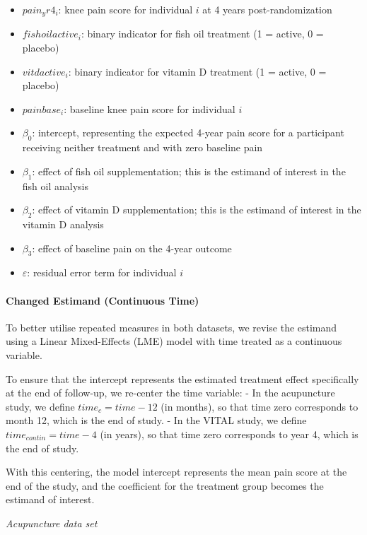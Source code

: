 \documentclass{article}
\providecommand{\tightlist}{%
  \setlength{\itemsep}{0pt}\setlength{\parskip}{0pt}}
\begin{document}
\begin{itemize}
\tightlist
\item
  \(pain_yr4_i\): knee pain score for individual \(i\) at 4 years
  post-randomization
\item
  \(fishoilactive_i\): binary indicator for fish oil treatment (1 =
  active, 0 = placebo)
\item
  \(vitdactive_i\): binary indicator for vitamin D treatment (1 =
  active, 0 = placebo)
\item
  \(painbase_i\): baseline knee pain score for individual \(i\)
\item
  \(\beta_0\): intercept, representing the expected 4-year pain score
  for a participant receiving neither treatment and with zero baseline
  pain
\item
  \(\beta_1\): effect of fish oil supplementation; this is the estimand
  of interest in the fish oil analysis
\item
  \(\beta_2\): effect of vitamin D supplementation; this is the estimand
  of interest in the vitamin D analysis
\item
  \(\beta_3\): effect of baseline pain on the 4-year outcome
\item
  \(\varepsilon\): residual error term for individual \(i\)
\end{itemize}

\paragraph{Changed Estimand (Continuous
Time)}\label{changed-estimand-continuous-time}

To better utilise repeated measures in both datasets, we revise the
estimand using a Linear Mixed-Effects (LME) model with time treated as a
continuous variable.

To ensure that the intercept represents the estimated treatment effect
specifically at the end of follow-up, we re-center the time variable: -
In the acupuncture study, we define \(time_c = time - 12\) (in months),
so that time zero corresponds to month 12, which is the end of study. -
In the VITAL study, we define \(time_{contin} = time - 4\) (in years),
so that time zero corresponds to year 4, which is the end of study.

With this centering, the model intercept represents the mean pain score
at the end of the study, and the coefficient for the treatment group
becomes the estimand of interest.

\emph{Acupuncture data set}
\end{document}
